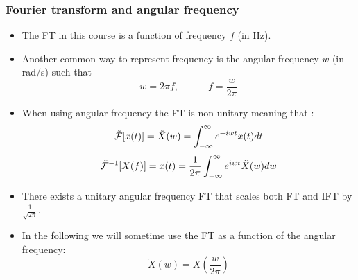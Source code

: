   \frametitle{Fourier transform and angular
  frequency}
  \begin{itemize}
  \item The FT in this course is a function of frequency $f$ (in Hz).
  \item Another common way to represent frequency is the angular frequency $w$ (in rad/s) such that
$$w=2\pi f,\quad \quad\quad f=\frac{w}{2\pi}$$
\item When using angular frequency the FT is non-unitary meaning that :
 $$   \mathcal{\tilde F}[x(t)]= \tilde X(w) = \int_{-\infty}^\infty e^{- i w t} x(t) d t  $$
 $$   \mathcal{\tilde F}^{-1}[X(f)] = x(t)= \frac{1}{2\pi}\int_{-\infty}^\infty e^{ i w t} \tilde X(w) d w $$
 \item There exists a unitary angular frequency FT that scales both FT and IFT by $\frac{1}{\sqrt{2\pi}}$.
  \item In the following we will sometime use the FT as a function of the angular frequency:
  $$ \tilde X(w)=X\left(\frac{w}{2\pi}\right)$$

  \end{itemize}


